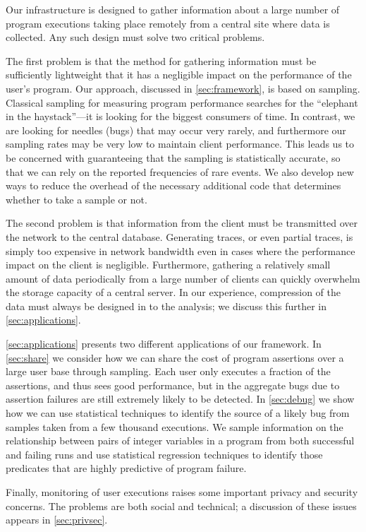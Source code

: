 Our infrastructure is designed to gather information about a
large number of program executions taking place remotely from
a central site where data is collected.  Any such design must solve
two critical problems.  

The first problem is that the method for gathering information must be
sufficiently lightweight that it has a negligible impact on the
performance of the user's program.  Our approach, discussed in
\autoref{sec:framework}, is based on sampling.  Classical sampling
for measuring program performance searches for the ``elephant in the
haystack''---it is looking for the biggest consumers of time.  In
contrast, we are looking for needles (bugs) that may occur very
rarely, and furthermore our sampling rates may be very low to maintain
client performance.  This leads us to be concerned with guaranteeing
that the sampling is statistically accurate, so that we can rely on
the reported frequencies of rare events.  We also develop new ways to
reduce the overhead of the necessary additional code that determines
whether to take a sample or not.

The second problem is that information from the client must be
transmitted over the network to the central database.  
Generating traces, or even partial traces, is simply too expensive in
network bandwidth even in cases where the performance impact on the
client is negligible.  Furthermore, gathering a relatively small
amount of data periodically from a large number of clients can
quickly overwhelm the storage capacity of a central server.  In our
experience, compression of the data must always be designed in to
the analysis; we discuss this further in \autoref{sec:applications}. 

\autoref{sec:applications} presents two different applications of our
framework.  In \autoref{sec:share} we consider how we can share the
cost of program assertions over a large user base through sampling.
Each user only executes a fraction of the assertions, and thus sees
good performance, but in the aggregate bugs due to assertion failures
are still extremely likely to be detected.  In \autoref{sec:debug} we
show how we can use statistical techniques to identify the source of a
likely bug from samples taken from a few thousand executions.  We
sample information on the relationship between pairs of integer
variables in a program from both successful and failing runs and use
statistical regression techniques to identify those predicates that are
highly predictive of program failure.

Finally, monitoring of user executions raises some important privacy
and security concerns.  The problems are both social and technical; a
discussion of these issues appears in \autoref{sec:privsec}.

